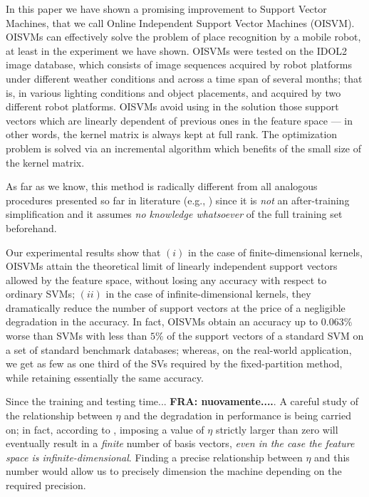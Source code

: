 In this paper we have shown a promising improvement to Support Vector
Machines, that we call Online Independent Support Vector Machines
(OISVM). OISVMs can effectively solve the problem of place recognition
by a mobile robot, at least in the experiment we have shown. OISVMs
were tested on the IDOL2 image database, which consists of image
sequences acquired by robot platforms under different weather
conditions and across a time span of several months; that is, in
various lighting conditions and object placements, and acquired by two
different robot platforms. OISVMs avoid using in the solution those
support vectors which are linearly dependent of previous ones in the
feature space --- in other words, the kernel matrix is always kept at
full rank. The optimization problem is solved via an incremental
algorithm which benefits of the small size of the kernel matrix.

As far as we know, this method is radically different from all
analogous procedures presented so far in literature (e.g.,
\cite{DownsGM01,nguyen2005,LeeM01,schoel06,KeerthiCDC06}) since it
is \emph{not} an after-training simplification and it assumes
\emph{no knowledge whatsoever} of the full training set beforehand.

Our experimental results show that $(i)$ in the case of
finite-dimensional kernels, OISVMs attain the theoretical limit of
linearly independent support vectors allowed by the feature space,
without losing any accuracy with respect to ordinary SVMs; $(ii)$ in
the case of infinite-dimensional kernels, they dramatically reduce the
number of support vectors at the price of a negligible degradation in
the accuracy. In fact, OISVMs obtain an accuracy up to $0.063\%$ worse
than SVMs with less than $5\%$ of the support vectors of a standard
SVM on a set of standard benchmark databases; whereas, on the
real-world application, we get as few as one third of the SVs required
by the fixed-partition method, while retaining essentially the same
accuracy.

Since the training and testing time... \textbf{FRA: nuovamente....}. A
careful study of the relationship between $\eta$ and the degradation
in performance is being carried on; in fact, according to
\cite{engel2004}, imposing a value of $\eta$ strictly larger than zero
will eventually result in a \emph{finite} number of basis vectors,
\emph{even in the case the feature space is
infinite-dimensional}. Finding a precise relationship between $\eta$
and this number would allow us to precisely dimension the machine
depending on the required precision.
